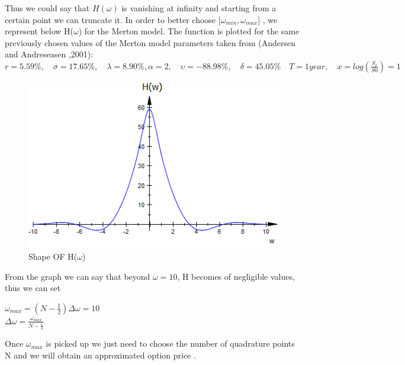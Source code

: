 \documentclass[12pt]{report}
\begin{document}
Thus we could say that $H(\omega)$ is vanishing at infinity and starting from a certain point we can truncate it. In order to better choose [$\omega_{min},\omega_{max}$] , we represent below H($\omega$) for the Merton model. The function is plotted for the same previously chosen values of the Merton model parameters taken from (Andersen and Andreseasen ,2001):\\ 
$ r =5.59 \%,\quad \sigma=17.65\%,\quad  \lambda=8.90\%, \alpha=2,\quad \upsilon = -88.98\%,\quad  \delta=45.05\% \quad T=1 year,\quad x=log(\frac{S_t}{S0})=1 $ 
\\
\begin{figure}[H]
\centering
\includegraphics{H.png} 
\caption{Shape OF H($\omega$)}
\end{figure}

 
From the graph we can say that beyond $\omega=10 $, H becomes of negligible values, thus we can set
\begin{center}
$\omega_{max}=(N-\frac{1}{2})\Delta \omega=10$\\
$\Delta \omega= \frac{\omega_{max}}{N-\frac{1}{2}}$

\end{center} 
 
Once $\omega_{max}$ is picked up we just need to choose the number of quadrature points N and we will obtain an approximated option price .
\end{document}
